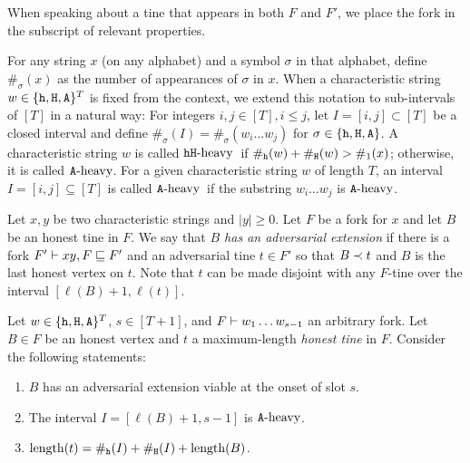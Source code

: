   \noindent
  When speaking about a tine that appears in both $F$ and $F'$, 
  we place the fork in the subscript of relevant properties.


    For any string $x$ (on any alphabet) and a symbol $\sigma$ in that alphabet, 
    define $\#_\sigma(x)$ 
    as the number of appearances of $\sigma$ in $x$. 
    When a characteristic string $w \in \{\mathtt{h}, \mathtt{H}, \mathtt{A}\}^T$ is fixed from the context, 
    we extend this notation to sub-intervals of $[T]$ in a natural way: 
    For integers $i, j \in [T], i \leq j$, 
    let $I = [i, j] \subset [T]$ be a closed interval 
    and define $\#_\sigma(I) = \#_\sigma(w_i \ldots w_j)$ for $\sigma \in \{\mathtt{h}, \mathtt{H}, \mathtt{A}\}$. 
    A characteristic string $w$ is called $\mathtt{h}\mathtt{H}\text{-heavy}$\ if $\#_{\mathtt{h}}(w) + \#_{\mathtt{H}}(w) > \#_1(x)$; 
    otherwise, it is called $\mathtt{A}\text{-heavy}$. 
    For a given characteristic string $w$ of length $T$, 
    an interval $I = [i,j] \subseteq [T]$ is called $\mathtt{A}\text{-heavy}$\ 
    if the substring $w_i \ldots w_j$ is $\mathtt{A}\text{-heavy}$.


    Let $x,y$ be two characteristic strings and $|y| \geq 0$.
    Let $F$ be a fork for $x$ and let $B$ be an honest tine in $F$. 
    We say that \emph{$B$ has an adversarial extension} 
    if there is a fork $F' \vdash xy, F \sqsubseteq F'$ and 
    an adversarial tine $t \in F'$ 
    so that $B \prec t$ and  
    $B$ is the last honest vertex on $t$. 
    Note that $t$ can be made disjoint with any $F$-tine 
    over the interval $[\ell(B) + 1, \ell(t)]$. 
    






    Let $w \in \{\mathtt{h}, \mathtt{H}, \mathtt{A}\}^T$,   
    $s \in [T + 1]$, and 
    $F \vdash w_1 \ldots w_{s - 1}$ an arbitrary fork. 
    Let $B \in F$ be an honest vertex 
    and $t$ a maximum-length \emph{honest tine} in $F$.
    Consider the following statements: 
    \begin{enumerate}[label=(\alph*)]
      \item \label{fact-part:viable-adv-ext} $B$ has an adversarial extension viable at the onset of slot $s$.
      \item \label{fact-part:Aheavy} The interval $I = [\ell(B) + 1, s - 1]$ is $\mathtt{A}\text{-heavy}$. 
      \item \label{fact-part:conservative} $\operatorname{length}(t) = \#_{\mathtt{h}}(I) + \#_{\mathtt{H}}(I) + \operatorname{length}(B)$.     
    \end{enumerate}



